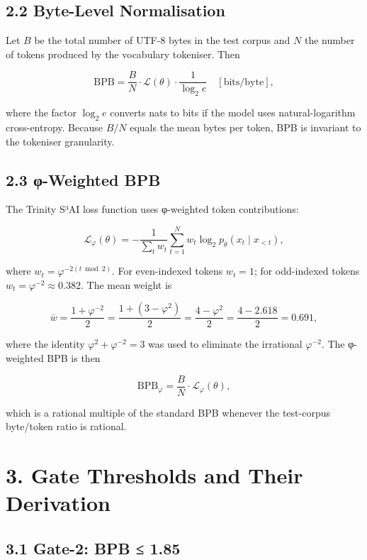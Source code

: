 \subsection{2.2 Byte-Level
Normalisation}\label{fa_14:byte-level-normalisation}

Let \(B\) be the total number of UTF-8 bytes in
the test corpus and \(N\) the number of tokens
produced by the vocabulary tokeniser. Then

\[\text{BPB} = \frac{B}{N} \cdot \mathcal{L}(\theta) \cdot \frac{1}{\log_2 e} \quad [\text{bits/byte}],\]

where the factor \(\log_2 e\) converts nats to
bits if the model uses natural-logarithm
cross-entropy. Because \(B/N\) equals the mean
bytes per token, BPB is invariant to the tokeniser
granularity.

\subsection{2.3 φ-Weighted
BPB}\label{fa_14:ux3c6-weighted-bpb}

The Trinity S³AI loss function uses φ-weighted
token contributions:

\[\mathcal{L}_\varphi(\theta) = -\frac{1}{\sum_t w_t} \sum_{t=1}^{N} w_t \log_2 p_\theta(x_t \mid x_{<t}),\]

where \(w_t = \varphi^{-2(t \bmod 2)}\). For
even-indexed tokens \(w_t = 1\); for odd-indexed
tokens \(w_t = \varphi^{-2} \approx 0.382\). The
mean weight is

\[\bar{w} = \frac{1 + \varphi^{-2}}{2} = \frac{1 + (3 - \varphi^2)}{2} = \frac{4 - \varphi^2}{2} = \frac{4 - 2.618}{2} = 0.691,\]

where the identity
\(\varphi^2 + \varphi^{-2} = 3\) was used to
eliminate the irrational \(\varphi^{-2}\). The
φ-weighted BPB is then

\[\text{BPB}_\varphi = \frac{B}{N} \cdot \mathcal{L}_\varphi(\theta),\]

which is a rational multiple of the standard BPB
whenever the test-corpus byte/token ratio is
rational.

\section{3. Gate Thresholds and Their
Derivation}\label{fa_14:gate-thresholds-and-their-derivation}

\subsection{3.1 Gate-2: BPB ≤
1.85}\label{fa_14:gate-2-bpb-1.85}

